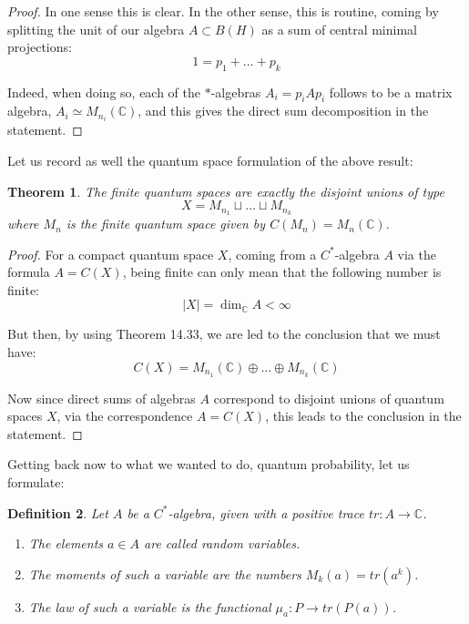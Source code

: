 \documentclass[12pt]{amsbook}
\newtheorem{theorem}{Theorem}[chapter]
\newtheorem{definition}[theorem]{Definition}
\begin{document}
\begin{proof}
In one sense this is clear. In the other sense, this is routine, coming by splitting the unit of our algebra $A\subset B(H)$ as a sum of central minimal projections:
$$1=p_1+\ldots+p_k$$

Indeed, when doing so, each of the $*$-algebras $A_i=p_iAp_i$ follows to be a matrix algebra, $A_i\simeq M_{n_i}(\mathbb C)$, and this gives the direct sum decomposition in the statement.
\end{proof}

Let us record as well the quantum space formulation of the above result:


\begin{theorem}
The finite quantum spaces are exactly the disjoint unions of type
$$X=M_{n_1}\sqcup\ldots\sqcup M_{n_k}$$
where $M_n$ is the finite quantum space given by $C(M_n)=M_n(\mathbb C)$.
\end{theorem}

\begin{proof}
For a compact quantum space $X$, coming from a $C^*$-algebra $A$ via the formula $A=C(X)$, being finite can only mean that the following number is finite:
$$|X|=\dim_\mathbb CA<\infty$$

But then, by using Theorem 14.33, we are led to the conclusion that we must have:
$$C(X)=M_{n_1}(\mathbb C)\oplus\ldots\oplus M_{n_k}(\mathbb C)$$

Now since direct sums of algebras $A$ correspond to disjoint unions of quantum spaces $X$, via the correspondence $A=C(X)$, this leads to the conclusion in the statement.
\end{proof}

Getting back now to what we wanted to do, quantum probability, let us formulate:

\begin{definition}
Let $A$ be a $C^*$-algebra, given with a positive trace $tr:A\to\mathbb C$.
\begin{enumerate}
\item The elements $a\in A$ are called random variables.

\item The moments of such a variable are the numbers $M_k(a)=tr(a^k)$.

\item The law of such a variable is the functional $\mu_a:P\to tr(P(a))$.
\end{enumerate}
\end{definition}
\end{document}
